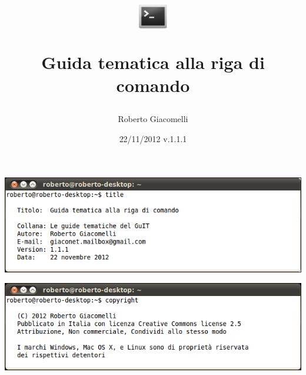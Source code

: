 \documentclass[b5paper,11pt,openany]{guidatematica}
\title{\includegraphics[width=0.1\textwidth]{image/terminal-icon}\par Guida tematica alla riga di comando}
\author{Roberto Giacomelli}
\date{22/11/2012 v.1.1.1}
\begin{document}
\frontmatter
\maketitle
\rule{0pt}{1pt}

\vfill

\noindent\includegraphics[width=\textwidth]{image/title}

\bigskip
\noindent\includegraphics[width=\textwidth]{image/copyright}

\bigskip
\scalebox{1.6}{\cc \ccby \ccnc \ccsa}
\newpage
\tableofcontents
\newpage



\mainmatter









\backmatter

\end{document}
